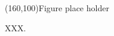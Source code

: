\begin{figure}[!h]
\centering
\framebox(160,100){Figure place holder}
\caption{XXX.} \label{fig:xx}
\end{figure}
